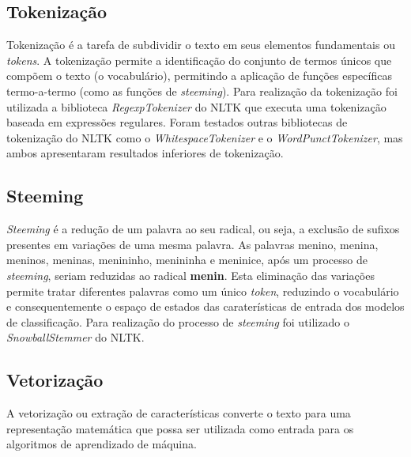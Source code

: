 \subsection{Tokenização}

Tokenização é a tarefa de subdividir o texto em seus elementos fundamentais ou \textit{tokens}. A tokenização permite a identificação do conjunto de termos únicos que compõem o texto (o vocabulário), permitindo a aplicação de funções específicas termo-a-termo (como as funções de \textit{steeming}). Para realização da tokenização foi utilizada a biblioteca \textit{RegexpTokenizer} do NLTK que executa uma tokenização baseada em expressões regulares. Foram testados outras bibliotecas de tokenização do NLTK como o \textit{WhitespaceTokenizer} e o \textit{WordPunctTokenizer}, mas ambos apresentaram resultados inferiores de tokenização.

\subsection{Steeming}

\textit{Steeming} é a redução de um palavra ao seu radical, ou seja, a exclusão de sufixos presentes em variações de uma mesma palavra. As palavras menino, menina, meninos,  meninas, menininho, menininha e meninice, após um processo de \textit{steeming}, seriam reduzidas ao radical \textbf{menin}. Esta eliminação das variações permite tratar diferentes palavras como um único \textit{token}, reduzindo o vocabulário e consequentemente o espaço de estados das caraterísticas de entrada dos modelos de classificação. Para realização do processo de \textit{steeming} foi utilizado o \textit{SnowballStemmer} do NLTK.

\subsection{Vetorização}

A vetorização ou extração de características converte o texto para uma representação matemática que possa ser utilizada como entrada para os algoritmos de aprendizado de máquina. 